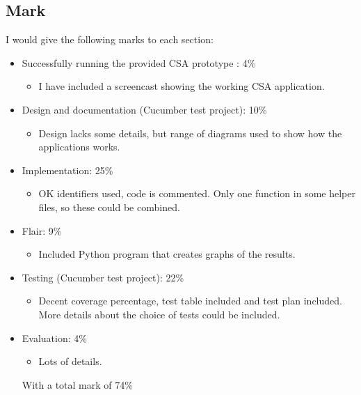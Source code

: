 \documentclass[10pt,a4paper,titlepage]{article}
\begin{document}
\subsection{Mark}
I would give the following marks to each section:
\begin{itemize}
\item Successfully running the provided CSA prototype : 4\%
	\begin{itemize}
	\item I have included a screencast showing the working CSA application. 
	\end{itemize}
\item Design and documentation (Cucumber test project): 10\%
	\begin{itemize}
	\item Design lacks some details, but range of diagrams used to show how the applications works.
	\end{itemize}
\item Implementation: 25\%
	\begin{itemize}
	\item OK identifiers used, code is commented. Only one function in some helper files, so these could be combined.
	\end{itemize}
\item Flair: 9\%
	\begin{itemize}
	\item Included Python program that creates graphs of the results.
	\end{itemize}
\item Testing (Cucumber test project): 22\%
	\begin{itemize}
	\item Decent coverage percentage, test table included and test plan included. More details about the choice of tests could be included.
	\end{itemize}
\item Evaluation: 4\%
	\begin{itemize}
	\item Lots of details.
	\end{itemize}
With a total mark of 74\%
\end{itemize}
\end{document}

